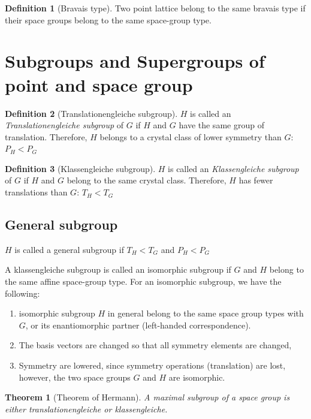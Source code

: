 \documentclass{amsart}
\newtheorem*{theorem}{Theorem}
\theoremstyle{remark}
\theoremstyle{remark}
\theoremstyle{definition}
\newtheorem*{definition}{Definition}
\begin{document}
\begin{definition}
    [Bravais type]
    Two point lattice belong to the same bravais type if their space groups belong to the same space-group type.
\end{definition}

\vspace{10pt}
\section*{Subgroups and Supergroups of point and space group}
\begin{definition}
    [Translationengleiche subgroup]
    $H$ is called an \emph{Translationengleiche subgroup} of $G$ if $H$ and $G$ have the same group of translation. 
    Therefore, $H$ belongs to a crystal class of lower symmetry than $G$: $P_H < P_G$
\end{definition}

\begin{definition}
    [Klassengleiche subgroup]
    $H$ is called an \emph{Klassengleiche subgroup} of $G$ if $H$ and $G$ belong to the same crystal class. 
    Therefore, $H$ has fewer translations than $G$: $T_H < T_G$
\end{definition}

\subsection*{General subgroup}
$H$ is called a general subgroup if $T_H < T_G$ and $P_H < P_G$

A klassengleiche subgroup is called an isomorphic subgroup if $G$ and $H$ belong to the same affine space-group type. 
For an isomorphic subgroup, we have the following:
\begin{enumerate}
    \item isomorphic subgroup $H$ in general belong to the same space group types with $G$, or its enantiomorphic partner (left-handed correspondence).
    \item The basis vectors are changed so that all symmetry elements are changed,
    \item Symmetry are lowered, since symmetry operations (translation) are lost, however, the two space groups $G$ and $H$ are isomorphic.
\end{enumerate}

\begin{theorem}
    [Theorem of Hermann]
    A maximal subgroup of a space group is either translationengleiche or klassengleiche.
\end{theorem}
\end{document}

